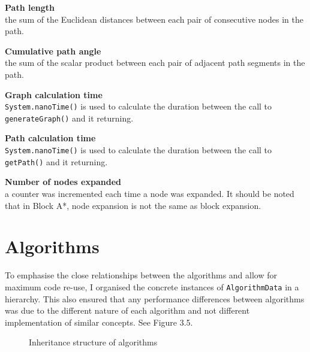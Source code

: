 \documentclass[12pt,twoside,notitlepage]{report}
\begin{document}
\begin{description}
\item {\bf Path length}\\ \hfill
the sum of the Euclidean distances between each pair of consecutive nodes in the path.
\item {\bf Cumulative path angle}\\ \hfill
the sum of the scalar product between each pair of adjacent path segments in the path.
\item {\bf Graph calculation time}\\ \hfill
{\tt System.nanoTime()} is used to calculate the duration between the call to {\tt generateGraph()} and it returning.
\item {\bf Path calculation time}\\ \hfill
{\tt System.nanoTime()} is used to calculate the duration between the call to {\tt getPath()} and it returning.
\item {\bf Number of nodes expanded}\\ \hfill
a counter was incremented each time a node was expanded. It should be noted that in Block A*, node expansion is not the same as block expansion.
\end{description}

\section{Algorithms}

To emphasise the close relationships between the algorithms and allow for maximum code re-use, I organised the concrete instances of {\tt AlgorithmData} in a hierarchy. This also ensured that any performance differences between algorithms was due to the different nature of each algorithm and not different implementation of similar concepts. See Figure 3.5.\\

\begin{figure}
\centering
{}
\caption{Inheritance structure of algorithms}
\end{figure}
\end{document}
